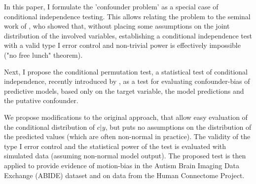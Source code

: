 \documentclass{article}
\theoremstyle{definition}
\begin{document}

In this paper, I formulate the 'confounder problem' as a special case of conditional independence testing. This allows relating the problem to the seminal work of \cite{shah2020hardness}, who showed that, without placing some assumptions on the joint distribution of the involved variables, establishing a conditional independence test with a valid type I error control and non-trivial power is effectively impossible ("no free lunch" theorem).

Next, I propose the conditional permutation test, a statistical test of conditional independence, recently introduced by \cite{berrett2020conditional}, as a test for evaluating confounder-bias of predictive models, based only on the target variable, the model predictions and the putative confounder.

We propose modifications to the original approach, that allow easy evaluation of the conditional distribution of $c|y$, but puts no assumptions on the distribution of the predicted values (which are often non-normal in practice).
The validity of the type I error control and the statistical power of the test is evaluated with simulated data (assuming non-normal model output).
The proposed test is then applied to provide evidence of motion-bias in the Autism Brain Imaging Data Exchange (ABIDE) dataset \citep{di2014autism} and on data from the Human Connectome Project.
\end{document}
